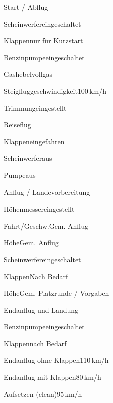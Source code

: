 \begin{checklist}{Start / Abflug}
	  \item{Scheinwerfer}{eingeschaltet}
	  \item{Klappen}{nur für Kurzstart}
	  \item{Benzinpumpe}{eingeschaltet}
	  \item{Gashebel}{vollgas}
	\item{Steigfluggeschwindigkeit}{100\,km/h}
	\item{Trimmung}{eingestellt}
\end{checklist}
	
\begin{checklist}{Reiseflug}
	\item{Klappen}{eingefahren}
	\item{Scheinwerfer}{aus}
	\item{Pumpe}{aus}
\end{checklist}

\begin{checklist}{Anflug / Landevorbereitung}
	\item{Höhenmesser}{eingestellt}
	\item{Fahrt/Geschw.}{Gem. Anflug}
	\item{Höhe}{Gem. Anflug}
	\item{Scheinwerfer}{eingeschaltet}
	\item{Klappen}{Nach Bedarf}
	\item{Höhe}{Gem. Platzrunde / Vorgaben}
\end{checklist}

\begin{checklist}{Endanflug und Landung}
	\item{Benzinpumpe}{eingeschaltet}
	\item{Klappen}{nach Bedarf}
	\item{Endanflug ohne Klappen}{110\,km/h}
	\item{Endanflug mit Klappen}{80\,km/h}
	\item{Aufsetzen (clean)}{95\,km/h}
\end{checklist}

